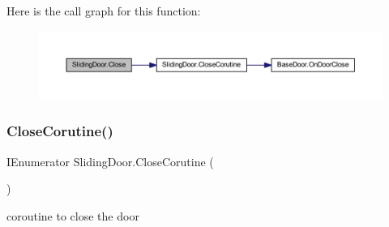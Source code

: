 Here is the call graph for this function\+:\nopagebreak
\begin{figure}[H]
\begin{center}
\leavevmode
\includegraphics[width=350pt]{class_sliding_door_a22d2e8580503b045da48510214599746_cgraph}
\end{center}
\end{figure}
\mbox{\label{class_sliding_door_adcfa4000b6eafa6ec8b6ec335dbd5efe}} 
\subsubsection{\texorpdfstring{Close\+Corutine()}{CloseCorutine()}}
{\footnotesize\ttfamily I\+Enumerator Sliding\+Door.\+Close\+Corutine (\begin{DoxyParamCaption}{ }\end{DoxyParamCaption})\hspace{0.3cm}{\ttfamily [private]}}



coroutine to close the door 

